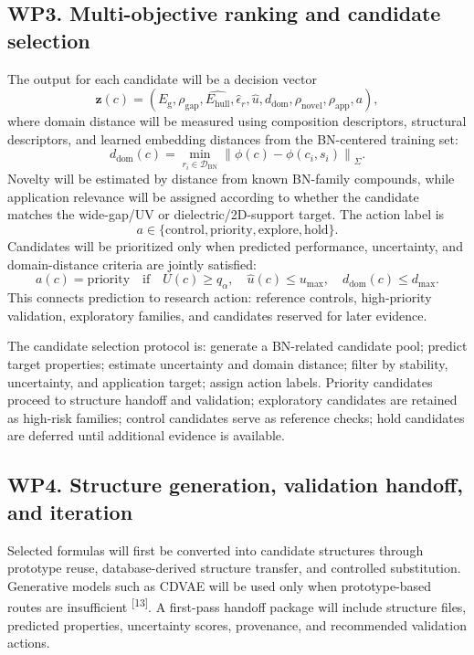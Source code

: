 \documentclass[10pt]{article}
\newcommand{\eg}{E_{\mathrm{g}}}
\newcommand{\ehull}{E_{\mathrm{hull}}}
\newcommand{\unc}{u}
\newcommand{\domain}{d_{\mathrm{dom}}}
\newcommand{\utility}{U}
\newcommand{\gapscore}{\rho_{\mathrm{gap}}}
\begin{document}
\subsection*{WP3. Multi-objective ranking and candidate selection}
The output for each candidate will be a decision vector
\[
  \mathbf{z}(c)=
  (\hat{\eg},\gapscore,\hat{\ehull},\hat{\epsilon}_r,\hat{\unc},\domain,
  \rho_{\mathrm{novel}},\rho_{\mathrm{app}},a),
\]
where domain distance will be measured using composition descriptors, structural descriptors, and learned embedding distances from the BN-centered training set:
\[
  \domain(c)=\min_{r_i\in\mathcal{D}_{\mathrm{BN}}}
  \left\|\phi(c)-\phi(c_i,s_i)\right\|_{\Sigma}.
\]
Novelty will be estimated by distance from known BN-family compounds, while application relevance will be assigned according to whether the candidate matches the wide-gap/UV or dielectric/2D-support target. The action label is
\[
  a\in\{\mathrm{control},\mathrm{priority},\mathrm{explore},\mathrm{hold}\}.
\]
Candidates will be prioritized only when predicted performance, uncertainty, and domain-distance criteria are jointly satisfied:
\[
  a(c)=\mathrm{priority}\quad\mathrm{if}\quad
  \utility(c)\ge q_{\alpha},\quad \hat{\unc}(c)\le u_{\max},\quad
  \domain(c)\le d_{\max}.
\]
This connects prediction to research action: reference controls, high-priority validation, exploratory families, and candidates reserved for later evidence.

The candidate selection protocol is: generate a BN-related candidate pool; predict target properties; estimate uncertainty and domain distance; filter by stability, uncertainty, and application target; assign action labels.
Priority candidates proceed to structure handoff and validation; exploratory candidates are retained as high-risk families; control candidates serve as reference checks; hold candidates are deferred until additional evidence is available.

\subsection*{WP4. Structure generation, validation handoff, and iteration}
Selected formulas will first be converted into candidate structures through prototype reuse, database-derived structure transfer, and controlled substitution. Generative models such as CDVAE will be used only when prototype-based routes are insufficient \textsuperscript{[13]}. A first-pass handoff package will include structure files, predicted properties, uncertainty scores, provenance, and recommended validation actions.
\end{document}
